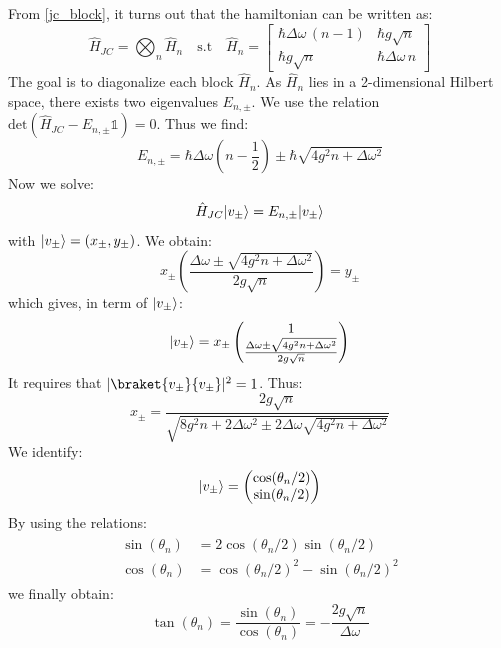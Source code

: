 \documentclass[10pt]{report}
\DeclarePairedDelimiter\ket{\lvert}{\rangle}
\begin{document}
From \ref{jc_block}, it turns out that the hamiltonian can be written as:
\begin{equation}
\hat{H}_{JC} = \bigotimes_n \hat{H}_n \quad \textrm{s.t} \quad \hat{H}_n = \begin{bmatrix}
\hbar \Delta\omega \, (n-1) & \hbar g \sqrt{n}\\
\hbar g \sqrt{n} & \hbar \Delta\omega \, n
\end{bmatrix}
\end{equation}
The goal is to diagonalize each block $\hat{H}_n$. As $\hat{H}_n$ lies in a 2-dimensional Hilbert space, there exists two eigenvalues $E_{n,\pm}$. We use the relation $\textrm{det}(\hat{H}_{JC} - E_{n,\pm}\mathbb{1}) = 0$. Thus we find:
\begin{equation}
E_{n,\pm} = \hbar\Delta\omega(n-\frac{1}{2}) \pm \hbar\sqrt{4g^2 n + \Delta\omega^2}
\end{equation}
Now we solve:
\begin{equation}
\hat{H}_{JC} \ket{v_\pm} = E_{n,\pm}\ket{v_\pm}
\end{equation}
with $\ket{v_\pm}=(x_\pm,y_\pm)$. We obtain:
\begin{equation}
x_\pm \left( \frac{\Delta\omega \pm \sqrt{4g^2n + \Delta\omega^2}}{2g\sqrt{n}} \right) = y_\pm
\end{equation}
which gives, in term of $\ket{v_\pm}$:
\begin{equation}
\ket{v_\pm} = x_\pm \begin{pmatrix}
1\\
\frac{\Delta\omega \pm \sqrt{4g^2n + \Delta\omega^2}}{2g\sqrt{n}}
\end{pmatrix}
\end{equation}
It requires that $\vert\braket{v_\pm}{v_\pm}\vert^2 = 1$. Thus:
\begin{equation}
x_\pm = \frac{2g\sqrt{n}}{\sqrt{8g^2n + 2\Delta\omega^2 \pm 2\Delta\omega \sqrt{4g^2n + \Delta\omega^2}}}
\end{equation}
We identify:
\begin{equation}
\ket{v_\pm} = \begin{pmatrix}
\cos(\theta_n/2)\\
\sin(\theta_n/2)
\end{pmatrix}
\end{equation}
By using the relations:
\begin{align}
\begin{split}
\sin(\theta_n) &= 2\cos(\theta_n/2)\sin(\theta_n/2)\\
\cos(\theta_n) &= \cos(\theta_n/2)^2 - \sin(\theta_n/2)^2
\end{split}
\end{align}
we finally obtain:
\begin{equation}
\tan(\theta_n) = \frac{\sin(\theta_n)}{\cos(\theta_n)} = -\frac{2g\sqrt{n}}{\Delta\omega}
\end{equation}
\end{document}
